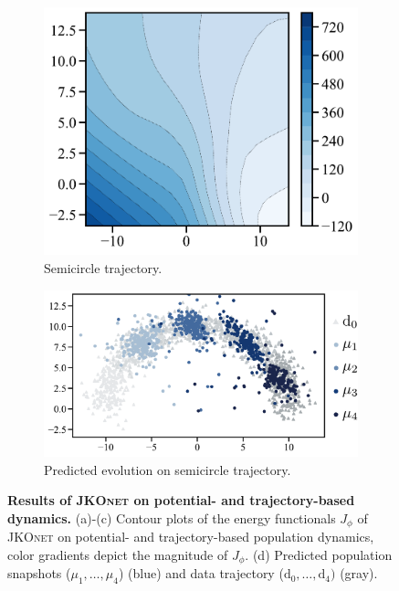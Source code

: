 \begin{figure}[t]
\begin{subfigure}[t]{0.21\textwidth}
     \end{subfigure}
     \hfill
     \begin{subfigure}[t]{0.22\textwidth}
         \centering
         \caption{Semicircle \protect\newline trajectory.}
         \includegraphics[width=\textwidth]{figures/fig_energy_implicit_semicircle_tf.pdf}
     \end{subfigure}
     \hfill
     \begin{subfigure}[t]{0.33\textwidth}
         \centering
         \caption{Predicted evolution \protect\newline on semicircle trajectory.}
         \includegraphics[width=\textwidth]{figures/fig_prediction_implicit_semicircle_tf.pdf}
     \end{subfigure}
	 \caption{\textbf{Results of \textsc{JKOnet} on potential- and trajectory-based dynamics.} (a)-(c) Contour plots of the energy functionals $J_\phi$ of \textsc{JKOnet} on potential- and trajectory-based population dynamics, color gradients depict the magnitude of $J_\phi$. (d) Predicted population snapshots ($\mu_1, \dots, \mu_4$) (blue) and data trajectory ($\mathrm{d}_0, \dots, \mathrm{d}_4)$ (gray).}
	 \label{fig:exp_jkonet_pot_traj}
\end{figure}

